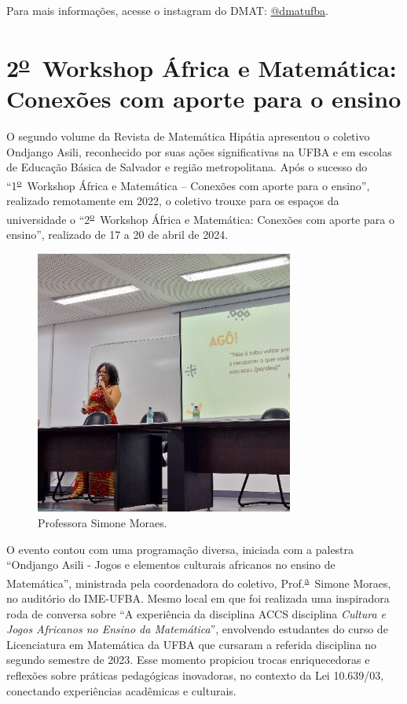 \documentclass{hipatia}
\newcommand{\superau}{\textsuperscript{\underline{a}}~}
\newcommand{\superou}{\textsuperscript{\underline{o}}~}
\begin{document}
Para mais informações, acesse o instagram do DMAT: \href{https://www.instagram.com/dmatufba?igsh=MXJ0NDVjaThwc2IwMQ==}{@dmatufba}.

\section{2\superou Workshop África e Matemática: Conexões com aporte para o ensino } 

O segundo volume da Revista de Matemática Hipátia apresentou o coletivo Ondjango Asili, reconhecido por suas ações significativas na UFBA e em escolas de Educação Básica de Salvador e região metropolitana. Após o sucesso do ``1\superou Workshop África e Matemática – Conexões com aporte para o ensino'', realizado remotamente em 2022, o coletivo trouxe para os espaços da universidade o ``2\superou Workshop África e Matemática: Conexões com aporte para o ensino'', realizado de 17 a 20 de abril de 2024.

\begin{figure}[htb]
    \centering
    \includegraphics[width=8.5cm]{WAM1.jpg}
    \caption{Professora Simone Moraes.}
 \label{WAM1}
\end{figure}

O evento contou com uma programação diversa, iniciada com a palestra ``Ondjango Asili - Jogos e elementos culturais africanos no ensino de Matemática'', ministrada pela coordenadora do coletivo, Prof.\superau Simone Moraes, no auditório do IME-UFBA. Mesmo local em que foi realizada uma inspiradora roda de conversa sobre ``A experiência da disciplina ACCS disciplina \textit{Cultura e Jogos Africanos no Ensino da Matemática}'', envolvendo estudantes do curso de Licenciatura em Matemática da UFBA que cursaram a referida disciplina no segundo semestre de 2023. Esse momento propiciou trocas enriquecedoras e reflexões sobre práticas pedagógicas inovadoras, no contexto da Lei 10.639/03, conectando experiências acadêmicas e culturais.
\end{document}
